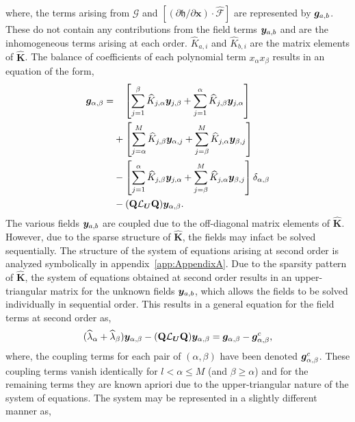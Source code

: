 where, the terms arising from $\mathcal{G}$ and $[(\partial \mathfrak{h}/\partial \mathbf{x})\cdot \mathcal{\widehat{F}}]$ are represented by $\boldsymbol{g}_{a,b}$. These do not contain any contributions from the field terms $\boldsymbol{y}_{a,b}$ and are the inhomogeneous terms arising at each order.  $\widehat{K}_{a,i}$ and $\widehat{K}_{b,i}$ are the matrix elements of $\mathbf{\widehat{K}}$. The balance of coefficients of each polynomial term $x_{\alpha}x_{\beta}$ results in an equation of the form,
\begin{align}
	\label{eqn:second_order_alpha_beta_terms}
	\begin{split}
		 \boldsymbol{g}_{\alpha,\beta} =& \ \ \ \left[\sum_{j=1}^{\beta}\widehat{K}_{j,\alpha}\boldsymbol{y}_{j,\beta} + \sum_{j=1}^{\alpha}\widehat{K}_{j,\beta}\boldsymbol{y}_{j,\alpha} \right] \\
		& + \left[\sum_{j=\alpha}^{M}\widehat{K}_{j,\beta}\boldsymbol{y}_{\alpha,j} + \sum_{j=\beta}^{M}\widehat{K}_{j,\alpha}\boldsymbol{y}_{\beta,j} \right] \\
		& - \left[\sum_{j=1}^{\alpha}\widehat{K}_{j,\beta}\boldsymbol{y}_{j,\alpha} + \sum_{j=\beta}^{M}\widehat{K}_{j,\alpha}\boldsymbol{y}_{\beta,j} \right]\delta_{\alpha,\beta} \\
		& - (\mathbf{Q}\mathcal{L}_{\boldsymbol{U}}\mathbf{Q})\boldsymbol{y}_{\alpha,\beta}.
	\end{split}
\end{align}
The various fields $\boldsymbol{y}_{a,b}$ are coupled due to the off-diagonal matrix elements of $\mathbf{\widehat{K}}$. However, due to the sparse structure of $\mathbf{\widehat{K}}$, the fields may infact be solved sequentially. The structure of the system of equations arising at second order is analyzed symbolically in appendix~\ref{app:AppendixA}. Due to the sparsity pattern of $\mathbf{\widehat{K}}$, the system of equations obtained at second order results in an upper-triangular matrix for the unknown fields $\boldsymbol{y}_{a,b}$, which allows the fields to be solved individually in sequential order. This results in a general equation for the field terms at second order as,
\begin{align}
	(\widehat{\lambda}_{\alpha} + \widehat{\lambda}_{\beta})\boldsymbol{y}_{\alpha,\beta} 
	- (\mathbf{Q}\mathcal{L}_{\boldsymbol{U}}\mathbf{Q})\boldsymbol{y}_{\alpha,\beta} = \boldsymbol{g}_{\alpha,\beta} - \boldsymbol{g}^{c}_{\alpha,\beta}, \nonumber
\end{align}
where, the coupling terms for each pair of $(\alpha,\beta)$ have been denoted $\boldsymbol{g}^{c}_{\alpha,\beta}$. These coupling terms vanish identically for $l < \alpha \le M$ (and $\beta\ge\alpha$) and for the remaining terms they are known apriori due to the upper-triangular nature of the system of equations. The system may be represented in a slightly different manner as, 
